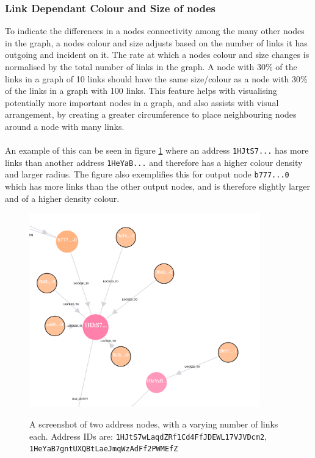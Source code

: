 \subsubsection{Link Dependant Colour and Size of nodes}
To indicate the differences in a nodes connectivity among the many other nodes in the graph, a nodes colour and size adjusts based on the number of links it has outgoing and incident on it. The rate at which a nodes colour and size changes is normalised by the total number of links in the graph. A node with 30\% of the links in a graph of 10 links should have the same size/colour as a node with 30\% of the links in a graph with 100 links. This feature helps with visualising potentially more important nodes in a graph, and also assists with visual arrangement, by creating a greater circumference to place neighbouring nodes around a node with many links. 
\\\\
An example of this can be seen in figure \ref{fig:address-nodes-colour-size-change} where an address \texttt{1HJtS7...} has more links than another address \texttt{1HeYaB...} and therefore has a higher colour density and larger radius. The figure also exemplifies this for output node \texttt{b777...0} which has more links than the other output nodes, and is therefore slightly larger and of a higher density colour.

\begin{figure}[h!]
  \centering
  \includegraphics[width = 10cm]{./figures/ui-screenshots/link-dependant-size-colour}\\[0.5cm] 
  \caption{A screenshot of two address nodes, with a varying number of links each.
  Address IDs are: \texttt{1HJtS7wLaqdZRf1Cd4FfJDEWL17VJVDcm2},\\\texttt{1HeYaB7gntUXQBtLaeJmqWzAdFf2PWMEfZ}}
  \label{fig:address-nodes-colour-size-change}
\end{figure}

